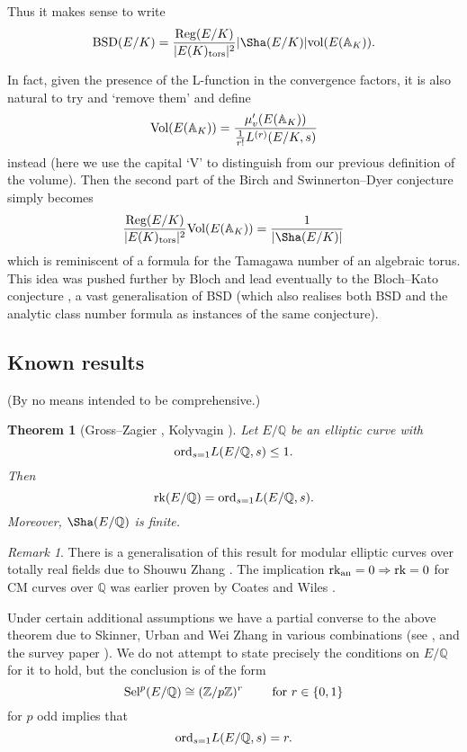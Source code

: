 \documentclass[12pt]{amsart}
\numberwithin{equation}{section}
\newtheorem{theorem}[equation]{Theorem}
\theoremstyle{remark}
\newtheorem{remark}[equation]{Remark}
\theoremstyle{definition}
\theoremstyle{definition}
\theoremstyle{definition}
\theoremstyle{definition}
\theoremstyle{definition}
\theoremstyle{definition}
\theoremstyle{definition}
\begin{document}
Thus it makes sense to write
\[\textup{BSD}(E/K)=\frac{\textup{Reg}(E/K)}{|E(K)_{\textup{tors}}|^2}|\Sha(E/K)| \textup{vol}(E(\mathbb{A}_K)).\]

In fact, given the presence of the L-function in the convergence factors, it is also natural to try and `remove them' and define 
\[\textup{Vol}(E(\mathbb{A}_K))=\frac{\mu_v'(E(\mathbb{A}_K))}{\frac{1}{r!}L^{(r)}(E/K,s)}\]
instead (here we use the capital `V'  to distinguish from our previous definition of the volume).  Then the second part of the Birch and Swinnerton--Dyer conjecture simply becomes
\[\frac{\textup{Reg}(E/K)}{|E(K)_{\textup{tors}}|^2}\textup{Vol}(E(\mathbb{A}_K))=\frac{1}{|\Sha(E/K)|}\]
which is reminiscent of a formula for the Tamagawa number of an algebraic torus. This idea was pushed further by Bloch \cite{MR570874} and lead eventually to  the Bloch--Kato conjecture \cite{MR1086888}, a vast generalisation of BSD (which also realises both BSD and the analytic class number formula as instances of the same conjecture).  
 
 \subsection{Known results} (By no means intended to be comprehensive.)
 
\begin{theorem}[Gross--Zagier \cite{MR833192}, Kolyvagin \cite{MR954295}]
Let $E/\mathbb{Q}$ be an elliptic curve with \[\textup{ord}_{s=1}L(E/\mathbb{Q},s)\leq 1.\] Then
\[\textup{rk}(E/\mathbb{Q})=\textup{ord}_{s=1}L(E/\mathbb{Q},s).\]
Moreover, $\Sha(E/\mathbb{Q})$ is finite. 
\end{theorem}

\begin{remark}
There is a generalisation of this result for modular elliptic curves over totally real fields due to Shouwu Zhang \cite{MR1826411}. The implication $\textup{rk}_{\textup{an}}=0 \Rightarrow \textup{rk}=0$ for CM curves over $\mathbb{Q}$ was earlier proven by Coates and Wiles \cite{MR0463176}.
\end{remark}

Under certain additional assumptions we have a partial converse to the above theorem due to Skinner, Urban and Wei Zhang in various combinations (see \cite{MR3148103}, \cite{MR3295917} and the survey paper \cite{MR3307716}). We do not attempt to state precisely the conditions on $E/\mathbb{Q}$ for it to hold, but the conclusion is of the form
\[\textup{Sel}^p(E/\mathbb{Q})\cong (\mathbb{Z}/p\mathbb{Z})^r~~~~~~\textup{ for }r\in \{0,1\}\]
for $p$ odd implies that \[\textup{ord}_{s=1}L(E/\mathbb{Q},s)=r.\]
\end{document}
